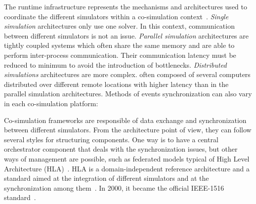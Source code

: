 \documentclass[1p]{elsarticle} %
\begin{document}
\noindent The runtime infrastructure represents the mechanisms and architectures used to coordinate the different simulators within a co-simulation context~\citep{ref:cintuglu2017survey,ref:law2000simulation}. \textit{Single simulation} architectures only use one solver. In this context, communication between different simulators is not an issue. \textit{Parallel simulation} architectures are tightly coupled systems which often share the same memory and are able to perform inter-process communication. Their communication latency must be reduced to minimum to avoid the introduction of bottlenecks. \textit{Distributed simulations} architectures are more complex. often composed of several computers distributed over different remote locations with higher latency than in the parallel simulation architectures.
Methods of events synchronization can also vary in each co-simulation platform:



Co-simulation frameworks are responsible of data exchange and synchronization between different simulators. From the architecture point of view, they can follow several styles for structuring components. One way is to have a central orchestrator component that deals with the synchronization issues, but other ways of management are possible, such as federated models typical of High Level Architecture (HLA)~\citep{HLAarch}.
HLA is a domain-independent reference architecture and a standard aimed at the integration of different simulators and at the synchronization among them~\citep{HLAarch}. In 2000, it became the official IEEE-1516 standard~\citep{IEEEHLA3}.  
\end{document}
